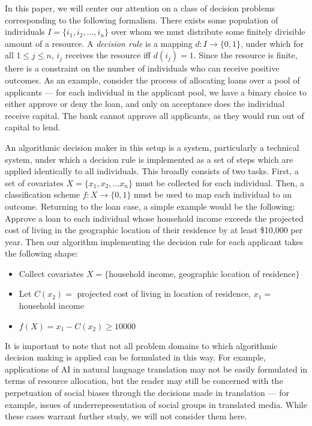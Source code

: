 In this paper, we will center our attention on a class of decision problems
corresponding to the following formalism. There exists some population of 
individuals $I = \{i_1, i_2, \ldots, i_n\}$ over whom we must distribute some
finitely divisible amount of a resource. A \textit{decision rule} is a
mapping $d: I \rightarrow \{0, 1\}$, under which for all $1\leq j\leq n$, $i_j$
receives the resource iff $d(i_j) = 1$. Since the resource is finite, there is a
constraint on the number of individuals who can receive positive outcomes. As an
example, consider the process of allocating loans over a pool of applicants —
for each individual in the applicant pool, we have a binary choice to either
approve or deny the loan, and only on acceptance does the individual receive
capital. The bank cannot approve all applicants, as they would run out of
capital to lend.

An algorithmic decision maker in this setup is a system, particularly a
technical system, under which a decision rule is implemented as a set of steps
which are applied identically to all individuals. This broadly consists of two
tasks. First, a set of covariates $X = \{x_1, x_2, \ldots x_n\}$ must be
collected for each individual. Then, a classification scheme
$f: X \rightarrow \{0, 1\}$ must be used to map each individual to an outcome.
Returning to the loan case, a simple example would be the following: Approve a
loan to each individual whose household income exceeds the projected cost of
living in the geographic location of their residence by at least \$10,000 per
year. Then our algorithm implementing the decision rule for each applicant takes
the following shape:
\begin{itemize}
    \item Collect covariates $X=\{$household income, geographic location of residence$\}$
    \item Let $C(x_2) =$ projected cost of living in location of residence, $x_1 =$
          household income
    \item $f(X) = x_1 - C(x_2) \geq 10000$
\end{itemize}

It is important to note that not all problem domains to which algorithmic
decision making is applied can be formulated in this way. For example,
applications of AI in natural language translation may not be easily formulated
in terms of resource allocation, but the reader may still be concerned with the
perpetuation of social biases through the decisions made in translation — for
example, issues of underrepresentation of social groups in translated media.  
While these cases warrant further study, we will not consider them here.

